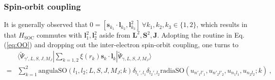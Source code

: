 \documentclass{article}
\begin{document}
\subsubsection{Spin-orbit coupling}
It is generally observed that $0= [\bm{s}_{k_1}\cdot\bm{l}_{k_2}, \bm{l}^2_{k_3}]~\forall k_1,k_2,k_3\in\{1,2\}$, which results in that $H_\mathrm{SOC}$ commutes with $\bm{l}_1^2,\bm{l}_2^2$ aside from $\bm{L}^2,\bm{S}^2,\bm{J}$. 
%
Adopting the routine in Eq. (\ref{eq:OO}) and dropping out the inter-electron spin-orbit coupling, one turns to
\begin{align}
&%
\langle\tilde\Psi_{\gamma',L,S,J,M_J}|\sum_{k=1,2}\xi(r_k)\bm{s}_k\cdot\bm{l}_k|\tilde\Psi_{\gamma,L,S,J,M_J}\rangle\nonumber \\
=&\sum_{k=1}^2 \text{angulaSO}(l_1,l_2;L,S,J,M_J;k)\delta_{l_1',l_1}\delta_{l_2',l_2}\text{radiaSO}(u_{n'_1l'_1},u_{n'_2l'_2},u_{n_1l_1},u_{n_2l_2};k)~,\label{eq:SOCbracket}
\end{align}
\end{document}
